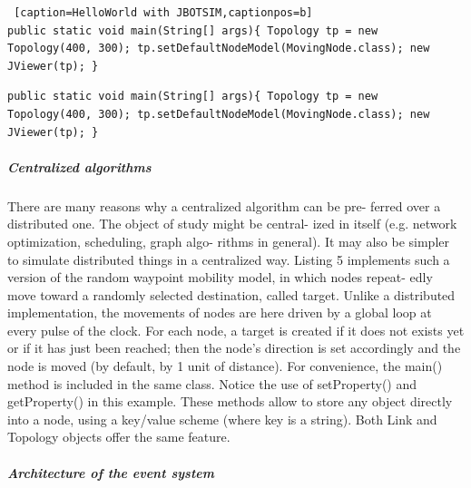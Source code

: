 \begin{lstlisting} [caption=HelloWorld with JBOTSIM,captionpos=b]
public static void main(String[] args){ Topology tp = new Topology(400, 300); tp.setDefaultNodeModel(MovingNode.class); new JViewer(tp); }
\end{lstlisting}

\begin{lstlisting}
public static void main(String[] args){ Topology tp = new Topology(400, 300); tp.setDefaultNodeModel(MovingNode.class); new JViewer(tp); }
\end{lstlisting}


\subparagraph{Centralized algorithms}There are many reasons why a centralized algorithm can be pre- ferred over a distributed one. The object of study might be central- ized in itself (e.g. network optimization, scheduling, graph algo- rithms in general). It may also be simpler to simulate distributed things in a centralized way. Listing 5 implements such a version of the random waypoint mobility model, in which nodes repeat- edly move toward a randomly selected destination, called target. Unlike a distributed implementation, the movements of nodes are here driven by a global loop at every pulse of the clock. For each node, a target is created if it does not exists yet or if it has just been reached; then the node’s direction is set accordingly and the node is moved (by default, by 1 unit of distance). For convenience, the main() method is included in the same class. Notice the use of setProperty() and getProperty() in this example. These methods allow to store any object directly into a node, using a key/value scheme (where key is a string). Both Link and Topology objects offer the same feature.
\subparagraph{Architecture of the event system}

